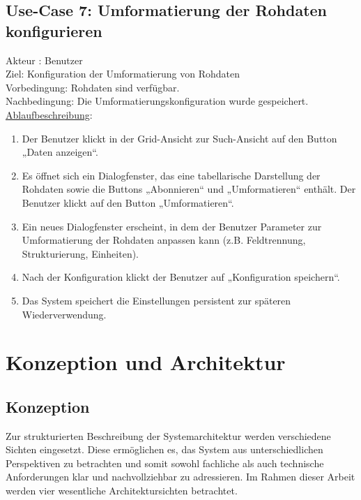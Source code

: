 \documentclass[a4paper,12pt]{scrreprt}
\begin{document}
\section*{\small \textbf{Use-Case 7: Umformatierung der Rohdaten konfigurieren}}
Akteur : Benutzer\\
Ziel:  Konfiguration der Umformatierung von Rohdaten\\
Vorbedingung: Rohdaten sind verfügbar.\\
Nachbedingung: Die Umformatierungskonfiguration wurde gespeichert.\\
\underline{Ablaufbeschreibung}:
\begin{enumerate}
	\item Der Benutzer klickt in der Grid-Ansicht zur Such-Ansicht auf den Button „Daten anzeigen“.
	\item Es öffnet sich ein Dialogfenster, das eine tabellarische Darstellung der Rohdaten sowie die Buttons „Abonnieren“ und „Umformatieren“ enthält. Der Benutzer klickt auf den Button „Umformatieren“.
	\item Ein neues Dialogfenster erscheint, in dem der Benutzer Parameter zur Umformatierung der Rohdaten anpassen kann (z.B. Feldtrennung, Strukturierung, Einheiten).
	\item Nach der Konfiguration klickt der Benutzer auf „Konfiguration speichern“.
	\item Das System speichert die Einstellungen persistent zur späteren Wiederverwendung.
\end{enumerate}
	
\chapter{Konzeption und Architektur}
\section{Konzeption}
Zur strukturierten Beschreibung der Systemarchitektur werden verschiedene Sichten eingesetzt. Diese ermöglichen es, das System aus unterschiedlichen Perspektiven zu betrachten und somit sowohl fachliche als auch technische Anforderungen klar und nachvollziehbar zu adressieren. Im Rahmen dieser Arbeit werden vier wesentliche Architektursichten betrachtet.
\end{document}
